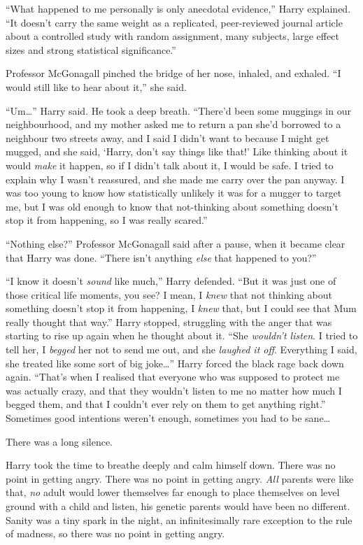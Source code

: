 ``What happened to me personally is only anecdotal evidence,'' Harry
explained. ``It doesn't carry the same weight as a replicated,
peer-reviewed journal article about a controlled study with random
assignment, many subjects, large effect sizes and strong statistical
significance.''

Professor McGonagall pinched the bridge of her nose, inhaled, and
exhaled. ``I would still like to hear about it,'' she said.

``Um\ldots{}'' Harry said. He took a deep breath. ``There'd been some
muggings in our neighbourhood, and my mother asked me to return a pan
she'd borrowed to a neighbour two streets away, and I said I didn't want
to because I might get mugged, and she said, `Harry, don't say things
like that!' Like thinking about it would \emph{make} it happen, so if I
didn't talk about it, I would be safe. I tried to explain why I wasn't
reassured, and she made me carry over the pan anyway. I was too young to
know how statistically unlikely it was for a mugger to target me, but I
was old enough to know that not-thinking about something doesn't stop it
from happening, so I was really scared.''

``Nothing else?'' Professor McGonagall said after a pause, when it
became clear that Harry was done. ``There isn't anything \emph{else}
that happened to you?''

``I know it doesn't \emph{sound} like much,'' Harry defended. ``But it
was just one of those critical life moments, you see? I mean, I
\emph{knew} that not thinking about something doesn't stop it from
happening, I \emph{knew} that, but I could see that Mum really thought
that way.'' Harry stopped, struggling with the anger that was starting
to rise up again when he thought about it. ``She \emph{wouldn't listen}.
I tried to tell her, I \emph{begged} her not to send me out, and she
\emph{laughed it off}. Everything I said, she treated like some sort of
big joke\ldots{}'' Harry forced the black rage back down again. ``That's
when I realised that everyone who was supposed to protect me was
actually crazy, and that they wouldn't listen to me no matter how much I
begged them, and that I couldn't ever rely on them to get anything
right.'' Sometimes good intentions weren't enough, sometimes you had to
be sane\ldots{}

There was a long silence.

Harry took the time to breathe deeply and calm himself down. There was
no point in getting angry. There was no point in getting angry.
\emph{All} parents were like that, \emph{no} adult would lower
themselves far enough to place themselves on level ground with a child
and listen, his genetic parents would have been no different. Sanity was
a tiny spark in the night, an infinitesimally rare exception to the rule
of madness, so there was no point in getting angry.

